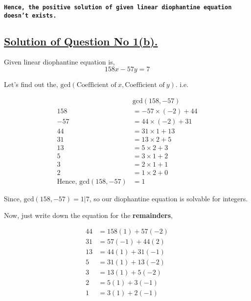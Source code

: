 \documentclass[a4paper,12pt]{article}
\begin{document}
    \texttt{{\bf Hence, the positive solution of given linear diophantine equation doesn't exists. }}



    \subsection*{\underline{Solution of Question No 1(b).}}

    Given linear diophantine equation is,
    \begin{equation*}
        158x - 57y = 7 \tag{1}
    \end{equation*}

    Let's find out the, $\mbox{gcd}(\mbox{Coefficient of}\  x ,\mbox{Coefficient of}\ y).$ i.e.

    \begin{equation*}
        \begin{split}
            & \mbox{gcd}(158,-57) \\[2mm]
            158 & = -57\times (-2) + 44 \\[2mm]
            -57 & = 44\times (-2) + 31 \\[2mm]
            44 & = 31\times 1 + 13 \\[2mm]
            31 & = 13\times 2 + 5 \\[2mm]
            13 & = 5\times 2 + 3 \\[2mm]
            5 & = 3\times 1 + 2 \\[2mm]
            3 & = 2\times 1 + 1 \\[2mm]
            2 & = 1\times 2 + 0 \\[2mm]
            \mbox{Hence, gcd}(158,-57) & = 1
        \end{split}    
    \end{equation*}

        
    Since, $\mbox{gcd}(158,-57)=1|7$, so our diophantine equation is solvable for integers.
    \vspace*{0.2cm}

    Now, just write down the equation for the {\bf remainders},

    \begin{equation*}
        \begin{split}
            44 & = 158(1) + 57(-2) \\
            31 & = 57(-1) + 44(2) \\[2mm]
            13 & = 44(1) + 31(-1) \\[2mm]
            5 & = 31(1) + 13(-2) \\[2mm]
            3 & = 13(1) + 5(-2) \\[2mm]
            2 & = 5(1) + 3(-1) \\[2mm]
            1 & = 3(1) + 2(-1) 
        \end{split}    
    \end{equation*}
\end{document}
